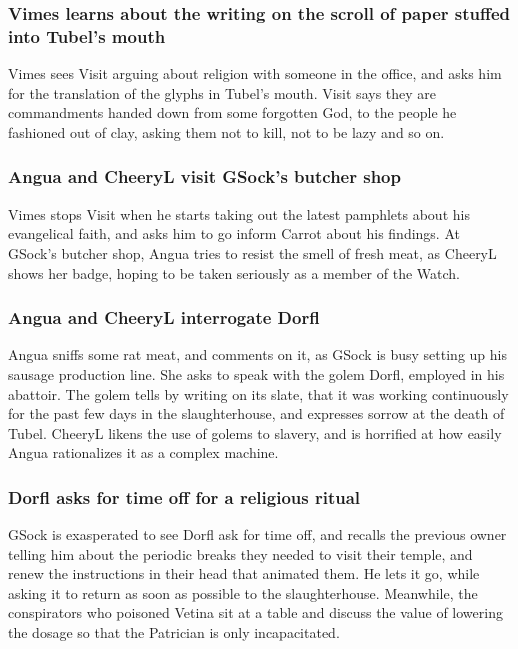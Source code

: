 \subsubsection{\Gls{Vimes} learns about the writing on the scroll of paper stuffed into
    \Gls{Tubel}'s mouth}
\Gls{Vimes} sees \Gls{Visit} arguing about religion with someone in the office, and asks him for
the translation of the glyphs in \Gls{Tubel}'s mouth. \Gls{Visit} says they are commandments handed
down from some forgotten God, to the people he fashioned out of clay, asking them not to kill, not
to be lazy and so on.

\subsubsection{\Gls{Angua} and \Gls{CheeryL} visit \Gls{GSock}'s butcher shop}
\Gls{Vimes} stops \Gls{Visit} when he starts taking out the latest pamphlets about his evangelical
faith, and asks him to go inform \Gls{Carrot} about his findings. At \Gls{GSock}'s butcher shop,
\Gls{Angua} tries to resist the smell of fresh meat, as \Gls{CheeryL} shows her badge, hoping to
be taken seriously as a member of the Watch.

\subsubsection{\Gls{Angua} and \Gls{CheeryL} interrogate \Gls{Dorfl}}
\Gls{Angua} sniffs some rat meat, and comments on it, as \Gls{GSock} is busy setting up his sausage
production line. She asks to speak with the golem \Gls{Dorfl}, employed in his abattoir. The golem
tells by writing on its slate, that it was working continuously for the past few days in the
slaughterhouse, and expresses sorrow at the death of \Gls{Tubel}. \Gls{CheeryL} likens the use of
golems to slavery, and is horrified at how easily \Gls{Angua} rationalizes it as a complex machine.

\subsubsection{\Gls{Dorfl} asks for time off for a religious ritual}
\Gls{GSock} is exasperated to see \Gls{Dorfl} ask for time off, and recalls the previous owner
telling him about the periodic breaks they needed to visit their temple, and renew the instructions
in their head that animated them. He lets it go, while asking it to return as soon as possible to
the slaughterhouse. Meanwhile, the conspirators who poisoned \Gls{Vetina} sit at a table and discuss
the value of lowering the dosage so that the Patrician is only incapacitated.


